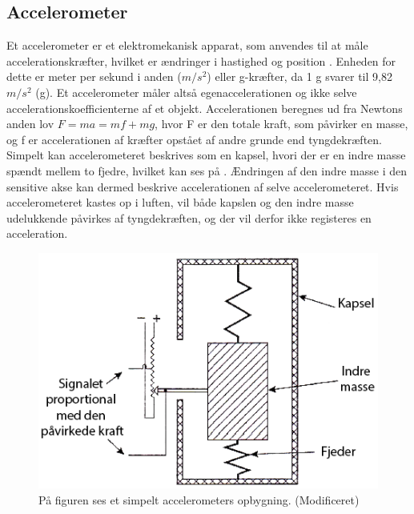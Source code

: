 \subsection{Accelerometer}
Et accelerometer er et elektromekanisk apparat, som anvendes til at måle accelerationskræfter, hvilket er ændringer i hastighed og position \citep{Goodrich2013,TittertonWeston2004}. Enheden for dette er meter per sekund i anden ($m/s^2$) eller g-kræfter, da 1 g svarer til 9,82$m/s^2$ (g). Et accelerometer måler altså egenaccelerationen og ikke selve accelerationskoefficienterne af et objekt. \citep{Sparkfun,TittertonWeston2004}
Accelerationen beregnes ud fra Newtons anden lov $F=ma=mf+mg$, hvor F er den totale kraft, som påvirker en masse, og f er accelerationen af kræfter opstået af andre grunde end tyngdekræften.\citep{TittertonWeston2004} \newline
Simpelt kan accelerometeret beskrives som en kapsel, hvori der er en indre masse spændt mellem to fjedre, hvilket kan ses på . Ændringen af den indre masse i den sensitive akse kan dermed beskrive accelerationen af selve accelerometeret. Hvis accelerometeret kastes op i luften, vil både kapslen og den indre masse udelukkende påvirkes af tyngdekræften, og der vil derfor ikke registeres en acceleration.\citep{TittertonWeston2004,Academic2016d} \newline

\begin{figure}[H]
	\centering
	\includegraphics[scale=0.5]{figures/bProblemloesning/accelerometer_basic.png}
	\caption{På figuren ses et simpelt accelerometers opbygning. \citep{TittertonWeston2004}(Modificeret)}
	\label{acc_simpelt}
\end{figure}

